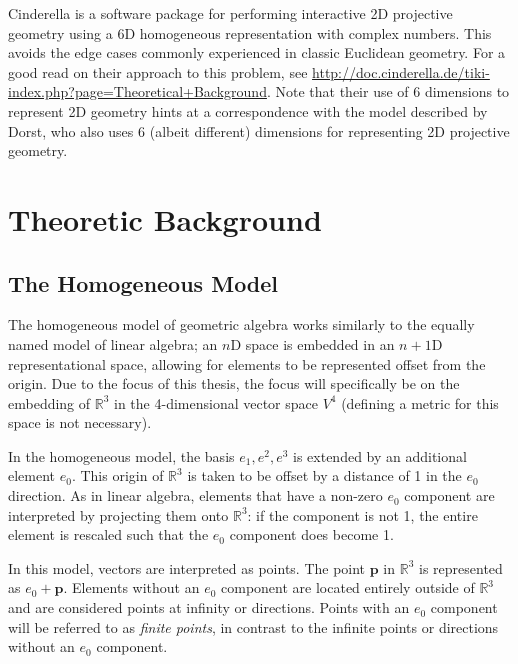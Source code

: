 \documentclass[a4paper, 10pt]{article}
\begin{document}
Cinderella\cite{richter1999interactive} is a software package for performing
interactive 2D projective geometry using a 6D homogeneous representation with
complex numbers. This avoids the edge cases commonly experienced in classic
Euclidean geometry. For a good read on their approach to this problem, see
\url{http://doc.cinderella.de/tiki-index.php?page=Theoretical+Background}.
Note that their use of 6 dimensions to represent 2D geometry hints at a
correspondence with the model described by Dorst, who also uses 6 (albeit
different) dimensions for representing 2D projective geometry.

\section{Theoretic Background}
\label{sec:background}

\subsection{The Homogeneous Model}
The homogeneous model of geometric algebra works similarly to the equally named
model of linear algebra; an $n$D space is embedded in an $n+1$D representational
space, allowing for elements to be represented offset from the origin. Due to
the focus of this thesis, the focus will specifically be on the embedding of
$\mathbb{R}^3$ in the 4-dimensional vector space $V^4$ (defining a metric for
this space is not necessary).

In the homogeneous model, the basis ${e_1, e^2, e^3}$ is extended by an
additional element $e_0$. This origin of $\mathbb{R}^3$ is taken to be offset by
a distance of 1 in the $e_0$ direction. As in linear algebra, elements that have
a non-zero $e_0$ component are interpreted by projecting them onto
$\mathbb{R}^3$: if the component is not 1, the entire element is rescaled such
that the $e_0$ component does become 1.

In this model, vectors are interpreted as points. The point $\mathbf{p}$ in
$\mathbb{R}^3$ is represented as $e_0 + \mathbf{p}$. Elements without an $e_0$
component are located entirely outside of $\mathbb{R}^3$ and are considered
points at infinity or directions. Points with an $e_0$ component will be
referred to as \emph{finite points}, in contrast to the infinite points or
directions without an $e_0$ component.
\end{document}
